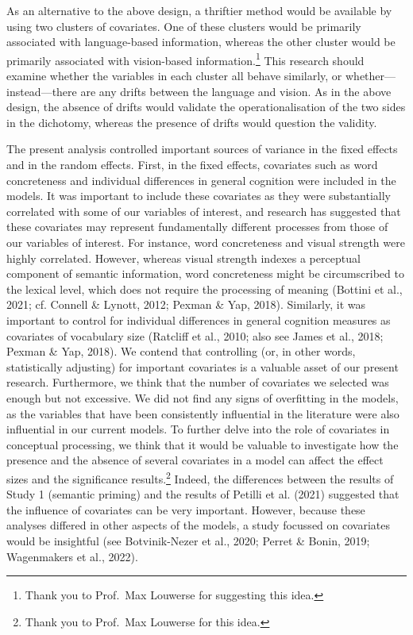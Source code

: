 \documentclass[
  12pt,
  man,floatsintext]{apa7}
\begin{document}
As an alternative to the above design, a thriftier method would be available by using two clusters of covariates. One of these clusters would be primarily associated with language-based information, whereas the other cluster would be primarily associated with vision-based information.\footnote{Thank you to Prof.~Max Louwerse for suggesting this idea.} This research should examine whether the variables in each cluster all behave similarly, or whether---instead---there are any drifts between the language and vision. As in the above design, the absence of drifts would validate the operationalisation of the two sides in the dichotomy, whereas the presence of drifts would question the validity.

The present analysis controlled important sources of variance in the fixed effects and in the random effects. First, in the fixed effects, covariates such as word concreteness and individual differences in general cognition were included in the models. It was important to include these covariates as they were substantially correlated with some of our variables of interest, and research has suggested that these covariates may represent fundamentally different processes from those of our variables of interest. For instance, word concreteness and visual strength were highly correlated. However, whereas visual strength indexes a perceptual component of semantic information, word concreteness might be circumscribed to the lexical level, which does not require the processing of meaning (Bottini et al., 2021; cf. Connell \& Lynott, 2012; Pexman \& Yap, 2018). Similarly, it was important to control for individual differences in general cognition measures as covariates of vocabulary size (Ratcliff et al., 2010; also see James et al., 2018; Pexman \& Yap, 2018). We contend that controlling (or, in other words, statistically adjusting) for important covariates is a valuable asset of our present research. Furthermore, we think that the number of covariates we selected was enough but not excessive. We did not find any signs of overfitting in the models, as the variables that have been consistently influential in the literature were also influential in our current models. To further delve into the role of covariates in conceptual processing, we think that it would be valuable to investigate how the presence and the absence of several covariates in a model can affect the effect sizes and the significance results.\footnote{Thank you to Prof.~Max Louwerse for this idea.} Indeed, the differences between the results of Study 1 (semantic priming) and the results of Petilli et al. (2021) suggested that the influence of covariates can be very important. However, because these analyses differed in other aspects of the models, a study focussed on covariates would be insightful (see Botvinik-Nezer et al., 2020; Perret \& Bonin, 2019; Wagenmakers et al., 2022).
\end{document}
